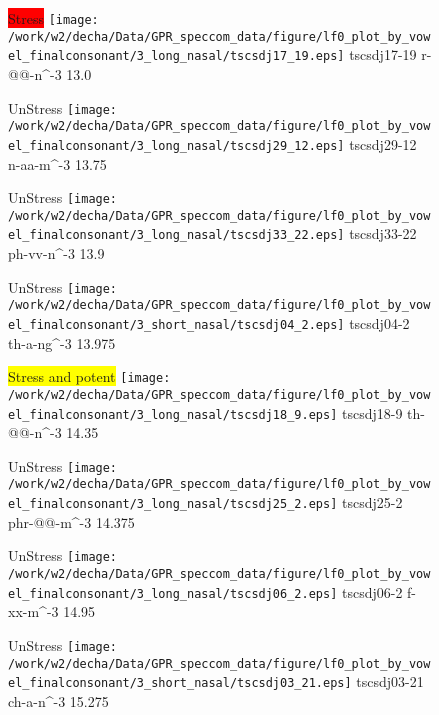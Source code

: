 \documentclass{article}
\begin{document}
\begin{figure}[t]
\begin{minipage}[b]{.24\textwidth}
\colorbox{red}{Stress}
\centering
\texttt{[image: /work/w2/decha/Data/GPR\_speccom\_data/figure/lf0\_plot\_by\_vowel\_finalconsonant/3\_long\_nasal/tscsdj17\_19.eps]}
tscsdj17-19 r-@@-n\textasciicircum-3 13.0
\end{minipage}
\begin{minipage}[b]{.24\textwidth}
UnStress
\centering
\texttt{[image: /work/w2/decha/Data/GPR\_speccom\_data/figure/lf0\_plot\_by\_vowel\_finalconsonant/3\_long\_nasal/tscsdj29\_12.eps]}
tscsdj29-12 n-aa-m\textasciicircum-3 13.75
\end{minipage}
\begin{minipage}[b]{.24\textwidth}
UnStress
\centering
\texttt{[image: /work/w2/decha/Data/GPR\_speccom\_data/figure/lf0\_plot\_by\_vowel\_finalconsonant/3\_long\_nasal/tscsdj33\_22.eps]}
tscsdj33-22 ph-vv-n\textasciicircum-3 13.9
\end{minipage}
\begin{minipage}[b]{.24\textwidth}
UnStress
\centering
\texttt{[image: /work/w2/decha/Data/GPR\_speccom\_data/figure/lf0\_plot\_by\_vowel\_finalconsonant/3\_short\_nasal/tscsdj04\_2.eps]}
tscsdj04-2 th-a-ng\textasciicircum-3 13.975
\end{minipage}
\end{figure}

\begin{figure}[t]
\begin{minipage}[b]{.24\textwidth}
\colorbox{yellow}{Stress and potent}
\centering
\texttt{[image: /work/w2/decha/Data/GPR\_speccom\_data/figure/lf0\_plot\_by\_vowel\_finalconsonant/3\_long\_nasal/tscsdj18\_9.eps]}
tscsdj18-9 th-@@-n\textasciicircum-3 14.35
\end{minipage}
\begin{minipage}[b]{.24\textwidth}
UnStress
\centering
\texttt{[image: /work/w2/decha/Data/GPR\_speccom\_data/figure/lf0\_plot\_by\_vowel\_finalconsonant/3\_long\_nasal/tscsdj25\_2.eps]}
tscsdj25-2 phr-@@-m\textasciicircum-3 14.375
\end{minipage}
\begin{minipage}[b]{.24\textwidth}
UnStress
\centering
\texttt{[image: /work/w2/decha/Data/GPR\_speccom\_data/figure/lf0\_plot\_by\_vowel\_finalconsonant/3\_long\_nasal/tscsdj06\_2.eps]}
tscsdj06-2 f-xx-m\textasciicircum-3 14.95
\end{minipage}
\begin{minipage}[b]{.24\textwidth}
UnStress
\centering
\texttt{[image: /work/w2/decha/Data/GPR\_speccom\_data/figure/lf0\_plot\_by\_vowel\_finalconsonant/3\_short\_nasal/tscsdj03\_21.eps]}
tscsdj03-21 ch-a-n\textasciicircum-3 15.275
\end{minipage}
\end{figure}
\end{document}
